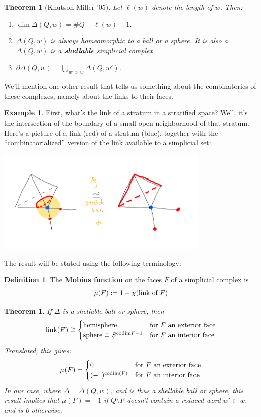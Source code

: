 \documentclass[12pt]{amsart}
\numberwithin{equation}{section}
\newtheorem{Theorem}[equation]{Theorem}
\theoremstyle{definition}
\newtheorem{Example}[equation]{Example}
\newtheorem{Definition}[equation]{Definition}
\numberwithin{figure}{section}
\begin{document}
\begin{Theorem}[Knutson-Miller '05] Let $\ell(w)$ denote the length of $w$. Then:
\begin{enumerate}
    \item $\dim \Delta(Q,w) = \# Q - \ell(w) - 1$.
    \item $\Delta (Q,w)$ is always homeomorphic to a ball or a sphere. It is also a $\Delta(Q,w)$ is a \textbf{shellable}  simplicial complex.  
    \item $\partial \Delta(Q,w) = \bigcup_{ w' > w} \Delta(Q,w')$.
\end{enumerate}
\end{Theorem}

We'll mention one other result that tells us something about the combinatorics of these complexes, namely about the links to their faces.

\begin{Example}
First, what's the link of a stratum in a stratified space?  Well, it's the intersection of the boundary of a small open neighborhood of that stratum.  Here's a picture of a link (red) of a stratum (blue), together with the ``combinatorialized'' version of the link available to a simplicial set:
\begin{center}
\includegraphics[width=4in]{6.1.png}
\end{center}
\end{Example}

The result will be stated using the following terminology:
\begin{Definition}
The \textbf{Mobius function} on the faces $F$ of a simplicial complex is
\[ \mu(F) := 1 - \chi(\textup{link of }F)\]
\end{Definition}

\begin{Theorem}
If $\Delta$ is a shellable ball or sphere, then 
    \[ \textup{link}(F) \cong \begin{cases} \textup{hemisphere} & \textup{for $F$ an exterior face}\\
    \textup{sphere} \cong S^{\textup{codim}{F} - 1} & \textup{for $F$ an interior face}\end{cases}\]
Translated, this gives:
\[\mu(F) = \begin{cases} 0 & \textup{for $F$ an exterior face}\\
   (-1)^{\text{codim}(F)}  & \textup{for $F$ an interior face}\end{cases}\]
In our case, where $\Delta = \Delta(Q,w)$, and is thus a shellable ball or sphere, this result implies that $\mu(F) = \pm1$ if $Q \setminus F$ doesn't contain a reduced word $w' \subset w$, and is 0 otherwise.
\end{Theorem}
\end{document}
